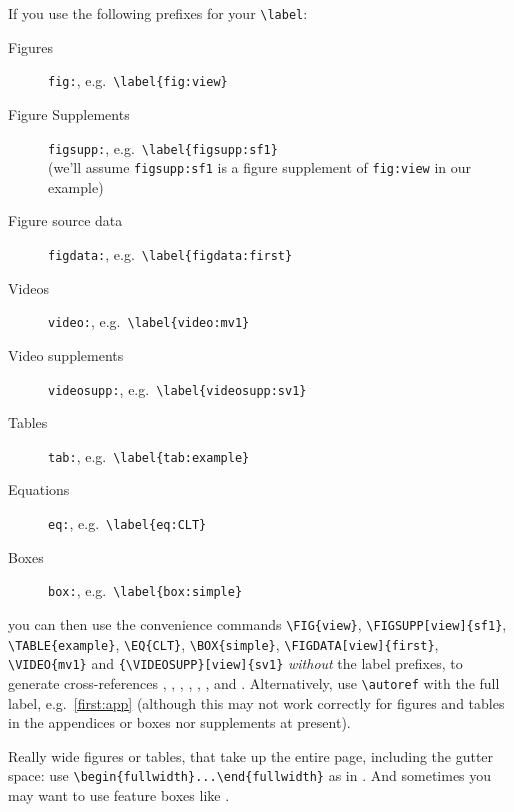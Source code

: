 \documentclass[9pt,lineno]{elife}
\begin{document}
If you use the following prefixes for your \verb|\label|:
%
\begin{description}
\item[Figures] \texttt{fig:}, e.g.~\verb|\label{fig:view}|
\item[Figure Supplements] \texttt{figsupp:}, e.g.~\verb|\label{figsupp:sf1}|\\
(we'll assume \texttt{figsupp:sf1} is a figure supplement of \texttt{fig:view} in our example)
\item[Figure source data] \texttt{figdata:}, e.g.~\verb|\label{figdata:first}|
\item[Videos] \texttt{video:}, e.g.~\verb|\label{video:mv1}|
\item[Video supplements] \texttt{videosupp:}, e.g.~\verb|\label{videosupp:sv1}|
\item[Tables] \texttt{tab:}, e.g.~\verb|\label{tab:example}|
\item[Equations] \texttt{eq:}, e.g.~\verb|\label{eq:CLT}|
\item[Boxes] \texttt{box:}, e.g.~\verb|\label{box:simple}|
\end{description}
%
you can then use the convenience commands \verb|\FIG{view}|, \verb|\FIGSUPP[view]{sf1}|, \verb|\TABLE{example}|, \verb|\EQ{CLT}|, \verb|\BOX{simple}|, \verb|\FIGDATA[view]{first}|, \verb|\VIDEO{mv1}| and \verb|{\VIDEOSUPP}[view]{sv1}| \emph{without} the label prefixes, to generate cross-references , ,  , , , ,  and . Alternatively, use \verb|\autoref| with the full label, e.g.~\autoref{first:app} (although this may not work correctly for figures and tables in the appendices or boxes nor supplements at present).

Really wide figures or tables, that take up the entire page, including the gutter space: use \verb|\begin{fullwidth}...\end{fullwidth}| as in . And sometimes you may want to use feature boxes like .
\end{document}
